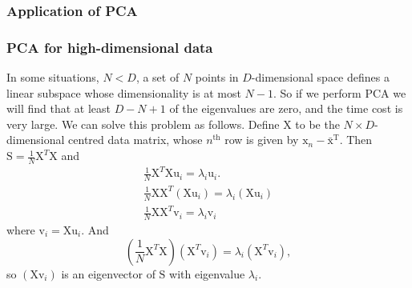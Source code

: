 \documentclass[a4paper]{book}
\newcommand{\mrm}{\mathrm}
\newcommand{\mx}{\mrm x}
\begin{document}
\subsubsection*{Application of PCA}
\subsubsection*{PCA for high-dimensional data}
In some situations, $N < D$, a set of $N$ points in $D$-dimensional space defines a linear subspace whose dimensionality is at most $N-1$. So if we perform PCA we will find that at least $D-N+1$ of the eigenvalues are zero, and the time cost is very large. We can solve this problem as follows. Define $\mrm X$ to be the $N\times D$-dimensional centred data matrix, whose $n^{\mrm{th}}$ row is given by $\mx_n-\bar{\mx}^{\mrm T}$. Then $\mrm S = \frac{1}{N}\mrm{X}^T\mrm X$ and
\begin{gather}\label{}
  \frac{1}{N}\mrm X^T\mrm X\mrm u_i=\lambda_i\mrm u_i. \\
  \frac{1}{N}\mrm X\mrm X^T(\mrm X\mrm u_i) = \lambda_i(\mrm X\mrm u_i) \\
  \frac{1}{N}\mrm X\mrm X^T\mrm v_i = \lambda_i\mrm v_i
\end{gather}
where $\mrm v_i = \mrm X\mrm u_i$. And
\begin{equation}\label{}
  (\frac{1}{N}\mrm X^T\mrm X)(\mrm X^T\mrm v_i) = \lambda_i(\mrm X^T\mrm v_i),
\end{equation}
so $(\mrm X\mrm v_i)$ is an eigenvector of $\mrm S$ with eigenvalue $\lambda_i$.
\end{document}
